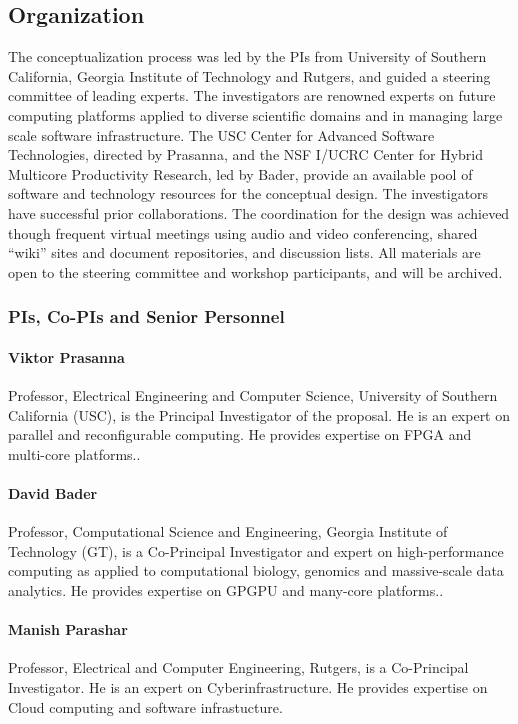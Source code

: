 \subsection{Organization}
The conceptualization process was led by the PIs from University of Southern California,
Georgia Institute of Technology and Rutgers, and guided a steering committee of
leading experts. 
The investigators are renowned experts on future computing platforms applied to
diverse scientific domains and in managing large scale software infrastructure. 
The USC Center for
Advanced Software Technologies, directed by Prasanna, 
and the NSF I/UCRC Center for Hybrid
Multicore Productivity Research, led by Bader, 
provide an available pool of software and technology
resources for the conceptual design. 
The investigators have successful prior collaborations. 
The coordination for the design was achieved though frequent virtual meetings using audio and video
conferencing, shared ``wiki'' sites and document repositories, and discussion lists. 
All materials are open to the steering committee and workshop participants, and will be archived.

\subsubsection{PIs, Co-PIs and Senior Personnel}

\paragraph{Viktor Prasanna} Professor, Electrical Engineering and Computer Science, University of Southern
California (USC), is the Principal Investigator of the proposal. He is an expert on parallel and
reconfigurable computing. He provides expertise on FPGA and multi-core platforms..

\paragraph{David Bader} Professor, Computational Science and Engineering, Georgia Institute of Technology
(GT), is a Co-Principal Investigator and expert on high-performance computing as applied to
computational biology, genomics and massive-scale data analytics. He provides expertise on
GPGPU and many-core platforms..

\paragraph{Manish Parashar} Professor, Electrical and Computer Engineering, Rutgers, is a Co-Principal Investigator.
He is an expert on Cyberinfrastructure. He provides expertise on Cloud computing
and software infrastucture.

